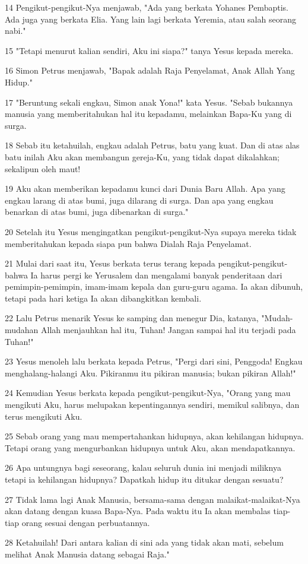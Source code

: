 \par 14 Pengikut-pengikut-Nya menjawab, "Ada yang berkata Yohanes Pembaptis. Ada juga yang berkata Elia. Yang lain lagi berkata Yeremia, atau salah seorang nabi."
\par 15 "Tetapi menurut kalian sendiri, Aku ini siapa?" tanya Yesus kepada mereka.
\par 16 Simon Petrus menjawab, "Bapak adalah Raja Penyelamat, Anak Allah Yang Hidup."
\par 17 "Beruntung sekali engkau, Simon anak Yona!" kata Yesus. "Sebab bukannya manusia yang memberitahukan hal itu kepadamu, melainkan Bapa-Ku yang di surga.
\par 18 Sebab itu ketahuilah, engkau adalah Petrus, batu yang kuat. Dan di atas alas batu inilah Aku akan membangun gereja-Ku, yang tidak dapat dikalahkan; sekalipun oleh maut!
\par 19 Aku akan memberikan kepadamu kunci dari Dunia Baru Allah. Apa yang engkau larang di atas bumi, juga dilarang di surga. Dan apa yang engkau benarkan di atas bumi, juga dibenarkan di surga."
\par 20 Setelah itu Yesus mengingatkan pengikut-pengikut-Nya supaya mereka tidak memberitahukan kepada siapa pun bahwa Dialah Raja Penyelamat.
\par 21 Mulai dari saat itu, Yesus berkata terus terang kepada pengikut-pengikut-bahwa Ia harus pergi ke Yerusalem dan mengalami banyak penderitaan dari pemimpin-pemimpin, imam-imam kepala dan guru-guru agama. Ia akan dibunuh, tetapi pada hari ketiga Ia akan dibangkitkan kembali.
\par 22 Lalu Petrus menarik Yesus ke samping dan menegur Dia, katanya, "Mudah-mudahan Allah menjauhkan hal itu, Tuhan! Jangan sampai hal itu terjadi pada Tuhan!"
\par 23 Yesus menoleh lalu berkata kepada Petrus, "Pergi dari sini, Penggoda! Engkau menghalang-halangi Aku. Pikiranmu itu pikiran manusia; bukan pikiran Allah!"
\par 24 Kemudian Yesus berkata kepada pengikut-pengikut-Nya, "Orang yang mau mengikuti Aku, harus melupakan kepentingannya sendiri, memikul salibnya, dan terus mengikuti Aku.
\par 25 Sebab orang yang mau mempertahankan hidupnya, akan kehilangan hidupnya. Tetapi orang yang mengurbankan hidupnya untuk Aku, akan mendapatkannya.
\par 26 Apa untungnya bagi seseorang, kalau seluruh dunia ini menjadi miliknya tetapi ia kehilangan hidupnya? Dapatkah hidup itu ditukar dengan sesuatu?
\par 27 Tidak lama lagi Anak Manusia, bersama-sama dengan malaikat-malaikat-Nya akan datang dengan kuasa Bapa-Nya. Pada waktu itu Ia akan membalas tiap-tiap orang sesuai dengan perbuatannya.
\par 28 Ketahuilah! Dari antara kalian di sini ada yang tidak akan mati, sebelum melihat Anak Manusia datang sebagai Raja."

